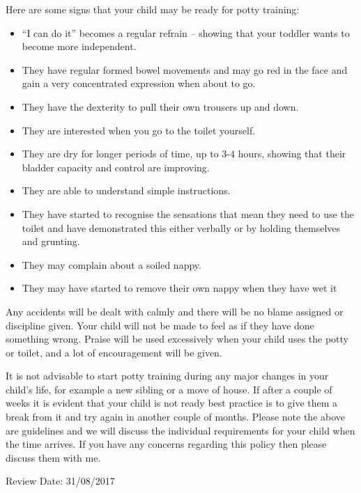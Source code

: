 Here are some signs that your child may be ready for potty training:
\begin{itemize}
\item ``I can do it'' becomes a regular refrain -- showing that your toddler wants to become more independent.
\item They have regular formed bowel movements and may go red in the face and gain a very concentrated expression when about to go.
\item They have the dexterity to pull their own trousers up and down.
\item They are interested when you go to the toilet yourself.
\item They are dry for longer periods of time, up to 3-4 hours, showing that their bladder capacity and control are improving.
\item They are able to understand simple instructions.
\item They have started to recognise the sensations that mean they need to use the toilet and have demonstrated this either verbally or by holding themselves and grunting.
\item They may complain about a soiled nappy.
\item They may have started to remove their own nappy when they have wet it
\end{itemize}

Any accidents will be dealt with calmly and there will be no blame assigned or discipline given. Your child will not be made to feel as if they have done something wrong. Praise will be used excessively when your child uses the potty or toilet, and a lot of encouragement will be given. 

It is not advisable to start potty training during any major changes in your child's life, for example a new sibling or a move of house. If after a couple of weeks it is evident that your child is not ready best practice is to give them a break from it and try again in another couple of months. Please note the above are guidelines and we will discuss the individual requirements for your child when the time arrives. If you have any concerns regarding this policy then please discuss them with me.

Review Date: 31/08/2017


